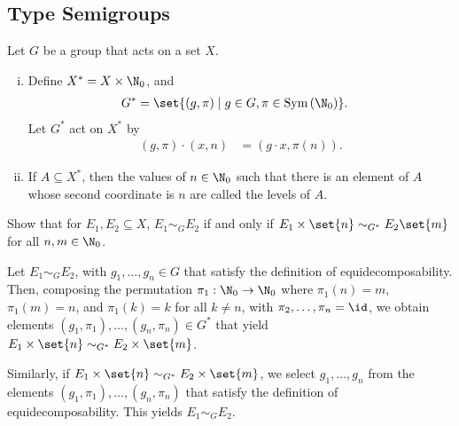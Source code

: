 \documentclass[10pt]{mypackage}
\begin{document}
  \subsection{Type Semigroups}%
  \begin{definition}
    Let $G$ be a group that acts on a set $X$.
    \begin{enumerate}[(i)]
      \item Define $X^{\ast} = X\times \N_{0}$, and
        \begin{align*}
          G^{\ast} &= \set{\left(g,\pi\right)\mid g\in G,\pi\in \text{Sym}\left(\N_0\right)}.
        \end{align*}
        Let $G^{\ast}$ act on $X^{\ast}$ by
        \begin{align*}
          \left(g,\pi\right)\cdot \left(x,n\right) &= \left(g\cdot x,\pi(n)\right).
        \end{align*}
      \item If $A\subseteq X^{\ast}$, then the values of $n\in \N_0$ such that there is an element of $A$ whose second coordinate is $n$ are called the levels of $A$.
    \end{enumerate}
  \end{definition}
  \begin{exercise}
    Show that for $E_1,E_2\subseteq X$, $E_1\sim_{G} E_2$ if and only if $E_1\times\set{n}\sim_{G^{\ast}}E_2\set{m}$ for all $n,m\in \N_0$.
  \end{exercise}
  \begin{solution}
    Let $E_1\sim_{G}E_2$, with $g_1,\dots,g_n\in G$ that satisfy the definition of equidecomposability. Then, composing the permutation $\pi_1: \N_0\rightarrow \N_0$ where $\pi_1(n) = m$, $\pi_1(m) = n$, and $\pi_1(k) = k$ for all $k\neq n$, with $\pi_2,\dots,\pi_n = \id$, we obtain elements $\left(g_1,\pi_1\right),\dots,\left(g_n,\pi_n\right)\in G^{\ast}$ that yield $E_1\times\set{n}\sim_{G^{\ast}}E_2\times \set{m}$.\newline

    Similarly, if $E_1\times\set{n} \sim_{G^{\ast}}E_2\times \set{m}$, we select $g_1,\dots,g_n$ from the elements $\left(g_1,\pi_1\right),\dots,\left(g_n,\pi_n\right)$ that satisfy the definition of equidecomposability. This yields $E_1\sim_{G}E_2$.
  \end{solution}
\end{document}

